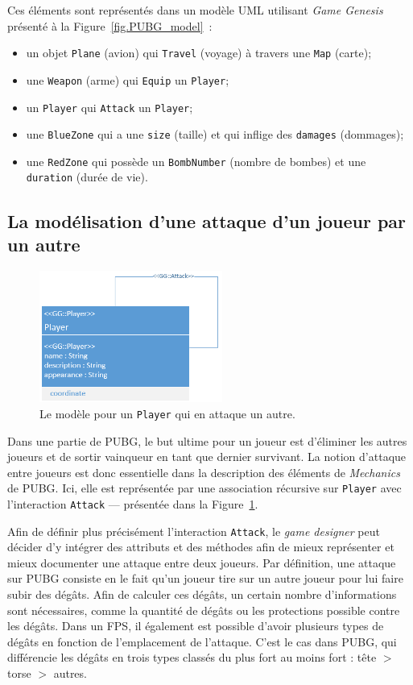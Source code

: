 Ces éléments sont représentés dans un modèle UML utilisant \emph{Game Genesis} présenté à la Figure~\ref{fig.PUBG_model}~: 
\begin{itemize}
    \item un objet \texttt{Plane} (avion) qui \texttt{Travel} (voyage) à travers une \texttt{Map} (carte);
    \item une \texttt{Weapon} (arme) qui \texttt{Equip} un \texttt{Player};
    \item un \texttt{Player} qui \texttt{Attack} un \texttt{Player};
    \item une \texttt{BlueZone} qui a une \texttt{size} (taille) et qui inflige des \texttt{damages} (dommages);
    \item une \texttt{RedZone} qui possède un \texttt{BombNumber} (nombre de bombes) et une \texttt{duration} (durée de vie).
\end{itemize}



\subsection{La modélisation d'une attaque d'un joueur par un autre}
\label{sect.attack}

\begin{figure}
    \centering
    \includegraphics[width=6cm]{10_img/chap6/attack_min.PNG}
    \caption{Le mod\`ele pour un \texttt{Player} qui en attaque un autre.}
    \label{fig.PUBG_attack_min}
\end{figure}

Dans une partie de PUBG, le but ultime pour un joueur est d'éliminer les autres joueurs et de sortir vainqueur en tant que dernier survivant. La notion d'attaque entre joueurs est donc essentielle dans la description des éléments de \emph{Mechanics} de PUBG. Ici, elle est représentée par une association récursive sur \texttt{Player} avec l'interaction \texttt{Attack} --- présentée dans la Figure~\ref{fig.PUBG_attack_min}. 

Afin de définir plus précisément l'interaction \texttt{Attack}, le \emph{game designer} peut décider d'y intégrer des attributs et des méthodes afin de mieux représenter et mieux documenter une attaque entre deux joueurs. Par définition, une attaque sur PUBG consiste en le fait qu'un joueur tire sur un autre joueur pour lui faire subir des dégâts.
%
Afin de calculer ces dégâts, un certain nombre d'informations sont n\'ecessaires, comme la quantité de dégâts ou les protections possible contre les dégâts.
Dans un FPS, il également est possible d'avoir plusieurs types de dégâts en fonction de l'emplacement de l'attaque.
C'est le cas dans PUBG, qui différencie les dégâts en trois types classés du plus fort au moins fort : tête $>$ torse $>$ autres.

